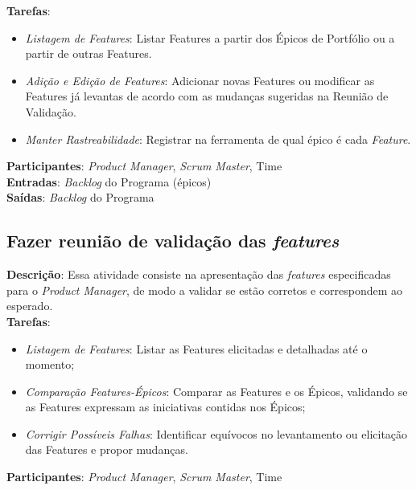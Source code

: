 \textbf{Tarefas}:

  \begin{itemize}
   \item \indent \textit{Listagem de Features}:  Listar Features a partir dos Épicos de Portfólio ou a partir de outras Features.

   \item \indent \textit{Adição e Edição de Features}: Adicionar novas Features ou modificar as Features já levantas de acordo com as mudanças sugeridas na Reunião de Validação.

   \item \indent \textit{Manter Rastreabilidade}: Registrar na ferramenta de qual épico é cada \textit{Feature}.
   \end{itemize}

\textbf{Participantes}: \textit{Product Manager}, \textit{Scrum Master}, Time \\

\textbf{Entradas}: \textit{Backlog} do Programa (épicos) \\

\textbf{Saídas}:   \textit{Backlog} do Programa \\

\subsection{Fazer reunião de validação das \textit{features}}
  \textbf{Descrição}: Essa atividade consiste na apresentação das \textit{features} especificadas para o \textit{Product Manager}, de modo a validar se
  estão corretos e correspondem ao esperado.  \\

  \textbf{Tarefas}:
  \begin{itemize}
   \item \indent \textit{Listagem de Features}: Listar as Features elicitadas e detalhadas até o momento;

   \item \indent \textit{Comparação Features-Épicos}: Comparar as Features e os Épicos, validando se as Features expressam as iniciativas contidas nos Épicos;

   \item \indent \textit{Corrigir Possíveis Falhas}: Identificar equívocos no levantamento ou elicitação das Features e propor mudanças.
  \end{itemize}

  \textbf{Participantes}: \textit{Product Manager}, \textit{Scrum Master}, Time \\

